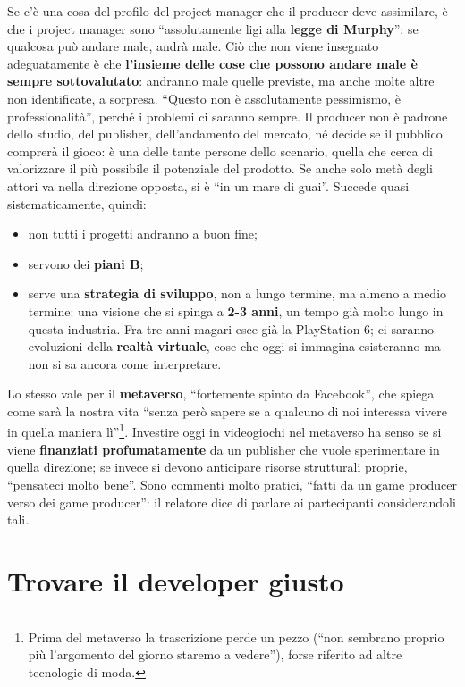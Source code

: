 Se c'è una cosa del profilo del project manager che il producer deve
assimilare, è che i project manager sono ``assolutamente ligi alla
\textbf{legge di Murphy}'': se qualcosa può andare male, andrà male. Ciò che non
viene insegnato adeguatamente è che \textbf{l'insieme delle cose che possono
andare male è sempre sottovalutato}: andranno male quelle previste, ma anche
molte altre non identificate, a sorpresa. ``Questo non è assolutamente
pessimismo, è professionalità'', perché i problemi ci saranno sempre. Il
producer non è padrone dello studio, del publisher, dell'andamento del mercato,
né decide se il pubblico comprerà il gioco: è una delle tante persone dello
scenario, quella che cerca di valorizzare il più possibile il potenziale del
prodotto. Se anche solo metà degli attori va nella direzione opposta, si è ``in
un mare di guai''. Succede quasi sistematicamente, quindi:
\begin{itemize}
  \item non tutti i progetti andranno a buon fine;
  \item servono dei \textbf{piani B};
  \item serve una \textbf{strategia di sviluppo}, non a lungo termine, ma almeno a
        medio termine: una visione che si spinga a \textbf{2-3 anni}, un tempo
        già molto lungo in questa industria. Fra tre anni magari esce già la
        PlayStation 6; ci saranno evoluzioni della \textbf{realtà virtuale}, cose
        che oggi si immagina esisteranno ma non si sa ancora come interpretare.
\end{itemize}
Lo stesso vale per il \textbf{metaverso}, ``fortemente spinto da Facebook'',
che spiega come sarà la nostra vita ``senza però sapere se a qualcuno di noi
interessa vivere in quella maniera lì''\footnote{Prima del metaverso la
trascrizione perde un pezzo (``non sembrano proprio più l'argomento del giorno
staremo a vedere''), forse riferito ad altre tecnologie di moda.}. Investire
oggi in videogiochi nel metaverso ha senso se si viene \textbf{finanziati
profumatamente} da un publisher che vuole sperimentare in quella direzione; se
invece si devono anticipare risorse strutturali proprie, ``pensateci molto
bene''. Sono commenti molto pratici, ``fatti da un game producer verso dei game
producer'': il relatore dice di parlare ai partecipanti considerandoli tali.

\section{Trovare il developer giusto}
\label{sec:z5-developer}

